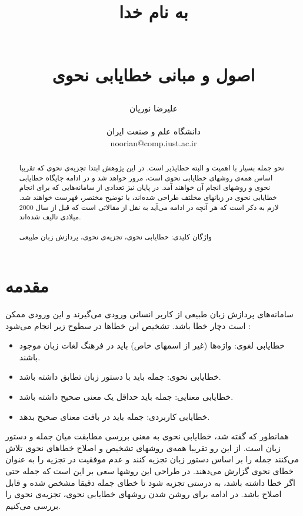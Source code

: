 \documentclass{report}
\title{
\begin{normalsize}
به نام خدا
\end{normalsize}
\\[4cm]
اصول و مبانی خطایابی نحوی
}
\author{علیرضا نوریان
\\
\\ \small دانشگاه علم و صنعت ایران
\\ \small noorian@comp.iust.ac.ir
}
\begin{document}
\maketitle

\tableofcontents

\begin{abstract}
نحو جمله بسیار با اهمیت و البته خطاپذیر است. در این پژوهش ابتدا تجزیه‌ی نحوی که تقریبا اساس همه‌ی روشهای خطایابی نحوی است، مرور خواهد شد و در ادامه جایگاه خطایابی نحوی و روشهای انجام آن خواهند آمد. در پایان نیز  تعدادی از سامانه‌هایی که برای انجام خطایابی نحوی در زبانهای مخلتف طراحی شده‌اند، با توضیح مختصر، فهرست خواهند شد. لازم به ذکر است که هر آنچه در ادامه می‌آید به نقل از مقالاتی است که قبل از سال 2000 میلادی تالیف شده‌اند.
\\
\\
واژگان کلیدی: خطایابی نحوی، تجزیه‌ی نحوی، پردازش زبان طبیعی

\end{abstract}

\section{مقدمه}
سامانه‌های پردازش زبان طبیعی از کاربر انسانی ورودی می‌گیرند  و این ورودی ممکن است دچار خطا باشد. تشخیص این خطاها در سطوح زیر انجام می‌شود \cite{ct2}:
\begin{itemize}
\item
خطایابی لغوی: واژه‌ها (غیر از اسمهای خاص) باید در فرهنگ لغات زبان موجود باشند.
\item
خطایابی نحوی: جمله باید با دستور زبان تطابق داشته باشد.
\item
خطایابی معنایی: جمله باید حداقل یک معنی صحیح داشته باشد.
\item
خطایابی کاربردی: جمله باید در بافت معنای صحیح بدهد.
\end{itemize}
همانطور که گفته شد، خطایابی نحوی به معنی بررسی مطابقت میان جمله و دستور زبان است. از این رو تقریبا همه‌ی روشهای تشخیص و اصلاح خطاهای نحوی تلاش می‌کنند جمله را بر اساس دستور زبان تجزیه کنند و عدم موفقیت در تجزیه را به عنوان خطای نحوی گزارش می‌دهند. در طراحی این روشها سعی بر این است که جمله حتی اگر خطا داشته باشد، به درستی تجزیه شود تا خطای جمله دقیقا مشخص شده و قابل اصلاح باشد. در ادامه برای روشن شدن روشهای خطایابی نحوی، تجزیه‌ی نحوی را بررسی می‌کنیم.
\end{document}
